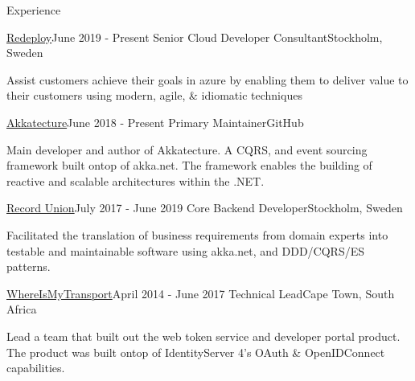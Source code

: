 \documentclass{resume} %
\begin{document}
    \begin{rSection}{Experience}

        \begin{rSubsection}
            {\href{https://redeploy.com}{Redeploy}}{June 2019 - Present}
            {Senior Cloud Developer Consultant}{Stockholm, Sweden}
            
            \item Assist customers achieve their goals in azure by enabling them to deliver
                value to their customers using modern, agile, \& idiomatic techniques
                
        \end{rSubsection}

        \begin{rSubsection}
            {\href{https://akkatecture.net}{Akkatecture}}{June 2018 - Present}
            {Primary Maintainer}{GitHub}
            
            \item Main developer and author of Akkatecture. A CQRS, and event sourcing
                framework built ontop of akka.net. The framework enables the
                building of reactive and scalable architectures within the .NET.
                
        \end{rSubsection}

        \begin{rSubsection}
            {\href{https://recordunion.com}{Record Union}}{July 2017 - June 2019}
            {Core Backend Developer}{Stockholm, Sweden}
            
            \item Facilitated the translation of business requirements from domain
                experts into testable and maintainable software using akka.net,
                and DDD/CQRS/ES patterns.
                
        \end{rSubsection}

        \begin{rSubsection}
            {\href{https://www.whereismytransport.com/}{WhereIsMyTransport}}{April 2014 - June 2017}
            {Technical Lead}{Cape Town, South Africa}
            
            \item Lead a team that built out the web token service and developer portal product.
                The product was built ontop of IdentityServer 4's OAuth \& OpenIDConnect capabilities.
            

\end{rSubsection}
\end{rSection}
\end{document}
